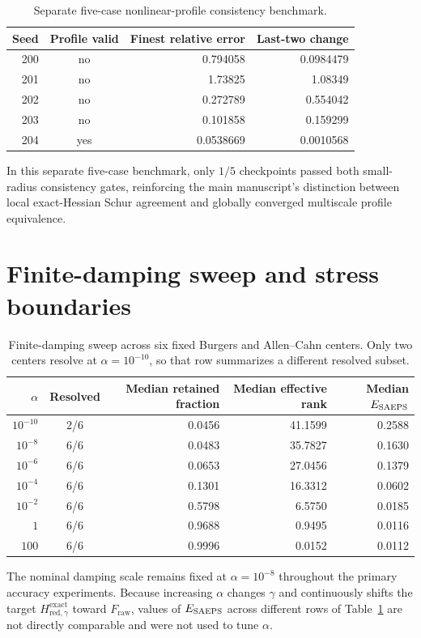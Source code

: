 \documentclass[10pt,letterpaper]{article}
\newcommand{\Fraw}{F_{\mathrm{raw}}}
\newcommand{\Hred}{H_{\mathrm{red},\gamma}^{\mathrm{exact}}}
\begin{document}
\begin{table}[!htbp]
\centering\small
\caption{Separate five-case nonlinear-profile consistency benchmark.}
\begin{tabular}{rcrr}
\toprule
Seed & Profile valid & Finest relative error & Last-two change\\\midrule
200 & no & 0.794058 & 0.0984479\\
201 & no & 1.73825 & 1.08349\\
202 & no & 0.272789 & 0.554042\\
203 & no & 0.101858 & 0.159299\\
204 & yes & 0.0538669 & 0.0010568\\\bottomrule
\end{tabular}
\end{table}
In this separate five-case benchmark, only $1/5$ checkpoints passed both small-radius consistency gates, reinforcing the main manuscript's distinction between local exact-Hessian Schur agreement and globally converged multiscale profile equivalence.

\section{Finite-damping sweep and stress boundaries}
\begin{table}[!htbp]
\centering\small
\caption{Finite-damping sweep across six fixed Burgers and Allen--Cahn centers. Only two centers resolve at $\alpha=10^{-10}$, so that row summarizes a different resolved subset.}
\label{tab:damping_sweep}
\begin{tabular}{rcrrr}
\toprule
$\alpha$ & Resolved & Median retained fraction & Median effective rank & Median $E_{\rm SAEPS}$\\\midrule
$10^{-10}$ & 2/6 & 0.0456 & 41.1599 & 0.2588\\
$10^{-8}$ & 6/6 & 0.0483 & 35.7827 & 0.1630\\
$10^{-6}$ & 6/6 & 0.0653 & 27.0456 & 0.1379\\
$10^{-4}$ & 6/6 & 0.1301 & 16.3312 & 0.0602\\
$10^{-2}$ & 6/6 & 0.5798 & 6.5750 & 0.0185\\
$1$ & 6/6 & 0.9688 & 0.9495 & 0.0116\\
$100$ & 6/6 & 0.9996 & 0.0152 & 0.0112\\\bottomrule
\end{tabular}
\end{table}
The nominal damping scale remains fixed at $\alpha=10^{-8}$ throughout the primary accuracy experiments.
Because increasing $\alpha$ changes $\gamma$ and continuously shifts the target $\Hred$ toward $\Fraw$, values of $E_{\rm SAEPS}$ across different rows of Table~\ref{tab:damping_sweep} are not directly comparable and were not used to tune $\alpha$.
\end{document}
